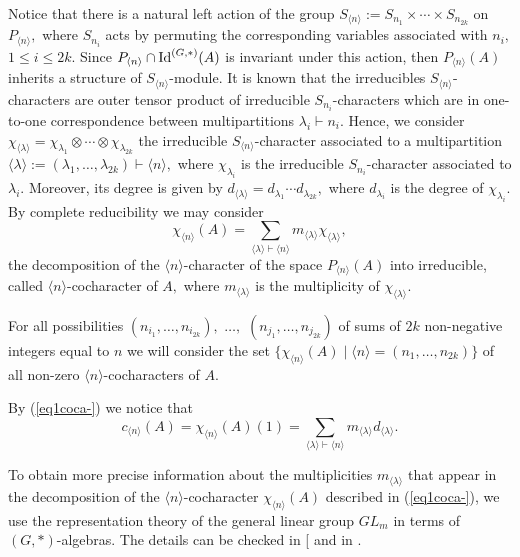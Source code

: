 \documentclass{amsart}
\newcommand{\IdG}{\ensuremath{\textnormal{Id}^{(G,\ast)}}}
\numberwithin{equation}{section}
\begin{document}
Notice that there is a natural left action of the group $S_{\langle n \rangle}:= S_{n_1}\times\cdots \times S_{n_{2k}}$ on $P_{\langle n \rangle},$ where $S_{n_i}$ acts by permuting
the corresponding variables associated with $n_i,$ $1\le i \le 2k.$ Since $P_{\langle n \rangle} \cap \IdG(A)$ is invariant under this
action, then $P_{\langle n \rangle}(A)$ inherits a structure of $S_{\langle n \rangle}$-module. It is known that the irreducibles $S_{\langle n \rangle}$-characters are
outer tensor product of irreducible $S_{n_i}$-characters which are in one-to-one correspondence between multipartitions
$\lambda_i \vdash n_i.$ Hence, we consider $\chi_{\langle \lambda \rangle}=\chi_{\lambda_1} \otimes\cdots \otimes \chi_{\lambda_{2k}}$ the irreducible $S_{\langle n \rangle}$-character associated to a multipartition
$\langle \lambda \rangle := (\lambda_1, \ldots, \lambda_{2k}) \vdash \langle n \rangle,$ where $\chi_{\lambda_i}$ is the irreducible $S_{n_i}$-character associated to $\lambda_i.$ Moreover, its degree
is given by $d_{\langle \lambda \rangle}=d_{\lambda_1} \cdots d_{\lambda_{2k}},$ where $d_{\lambda_i}$ is the degree of $\chi_{\lambda_i}$. By complete reducibility we may consider
\begin{equation}\label{eq1coca-}\chi_{\langle n \rangle}(A)=\sum\limits_{\langle \lambda \rangle \vdash \langle n \rangle} m_{\langle \lambda \rangle} \chi_{\langle \lambda \rangle},\end{equation}
the decomposition of the $\langle n \rangle$-character of the space $P_{\langle n \rangle}(A)$ into irreducible, called $\langle n \rangle$-cocharacter of $A,$
where $m_{\langle \lambda \rangle}$ is the multiplicity of $\chi_{\langle \lambda \rangle}$. 

For all possibilities $(n_{i_{1}},\ldots , n_{i_{2k}}),$ $ \ldots ,$ $ (n_{j_{1}},\ldots , n_{j_{2k}})$ of sums of $2k$ non-negative integers equal to $n$ we will consider the set $\{\chi_{\langle n \rangle  }(A)\mid \langle n\rangle =(n_1, \ldots, n_{2k})  \}$ of all non-zero $\langle n \rangle $-cocharacters of $A$.
    

By (\ref{eq1coca-}) we notice that
 \begin{equation} \label{cmultin-}
     c_{\langle n \rangle }(A)= \chi_{\langle n \rangle}(A)(1)=\sum\limits_{\langle \lambda \rangle \vdash \langle n \rangle} m_{\langle \lambda \rangle} d_{\langle \lambda \rangle}.
 \end{equation}

    
 To obtain more precise information about the multiplicities $m_{\langle \lambda \rangle}$ that appear in the decomposition of the $\langle n \rangle$-cocharacter $\chi_{\langle n \rangle}(A)$ described in (\ref{eq1coca-}), we use the representation theory of the general linear group $GL_m$ in terms of $(G, *)$-algebras. The
details can be checked in [\cite[Section 12.4]{Dr} and in \cite{OSV}.
\end{document}
